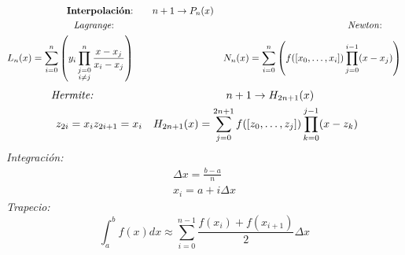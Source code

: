 \documentclass[12pt]{article}
\begin{document}
\begin{align*}
\text{\textbf{Interpolación}:} & \qquad n+1 \rightarrow P_n(x) & \\
  \text{\textit{Lagrange}:} \qquad & \qquad & \text{\textit{Newton}:} \qquad \\
  L_n(x) = \sum_{i=0}^n \left(y_i\prod_{\substack{j=0 \\ i \neq j}}^n \frac{x-x_j}{x_i - x_j}\right) & & N_n(x) = \sum_{i=0}^n \left(f([x_0, \ldots, x_i]) \prod_{j=0}^{i-1}(x-x_j)\right)
\end{align*}
\begin{align*}
\text{\textit{Hermite:}} &  & n+1 \rightarrow H_{2n+1}(x) \qquad \qquad \\
z_{2i} = x_i & z_{2i+1} = x_i & H_{2n+1}(x) = \sum_{j=0}^{2n+1}f([z_0, \ldots, z_j])\prod_{k=0}^{j-1}(x - z_k)
\end{align*}
  \textit{Integración:}
  \begin{eqnarray*}
   \Delta x = \frac{b-a}{n}\\
   x_i = a + i \Delta x
  \end{eqnarray*}
  \textit{Trapecio:}
  $$\int_a^b f(x)dx \approx \sum_{i=0}^{n-1} \frac{f(x_i) + f(x_{i+1})}{2}\Delta x$$
\end{document}
